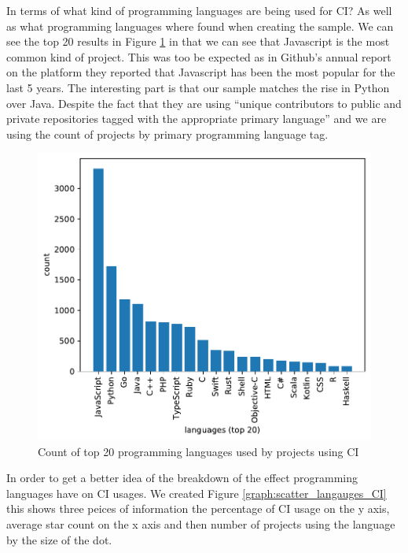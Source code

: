 \documentclass[twoside,12pt,titlepage,a4paper]{article}
\begin{document}
In terms of what kind of programming languages are being used for CI? As well as what programming languages where found when creating the sample. We can see the top 20 results in Figure \ref{graph:programming_langs_count_ci} in that we can see that Javascript is the most common kind of project. This was too be expected as in Github's annual report \cite{GithubOctoverseResults} on the platform they reported that Javascript has been the most popular for the last 5 years. The interesting part is that our sample matches the rise in Python over Java. Despite the fact that they are using \enquote{unique contributors to public and private repositories tagged with the appropriate primary language} and we are using the count of projects by primary programming language tag. 

\begin{figure}[!h]
  \centering
  \includegraphics[width=.8\textwidth]{../src/results/languages-topn.pdf}
  \caption{Count of top 20 programming languages used by projects using CI}
  \label{graph:programming_langs_count_ci}
\end{figure}

In order to get a better idea of the breakdown of the effect programming languages have on CI usages. We created Figure \ref{graph:scatter_langauges_CI} this shows three peices of information the percentage of CI usage on the y axis, average star count on the x axis and then number of projects using the language by the size of the dot. 
\end{document}
